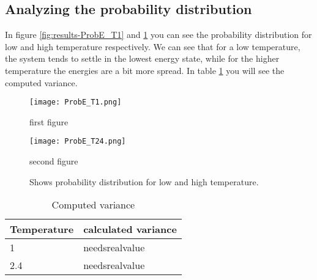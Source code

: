\documentclass[../main.tex]{subfiles}
\begin{document}
\subsection{Analyzing the probability distribution}
In figure \ref{fig:results-ProbE_T1} and \ref{fig:results-ProbE_T24} you can see the probability distribution for low and high temperature respectively. We can see that for a low temperature, the system tends to settle in the lowest energy state, while for the higher temperature the energies are a bit more spread. In table \ref{tab:results-variance} you will see the computed variance.
\begin{figure}[!h]
  \centering
  \begin{minipage}{0.5\textwidth}
        \centering
        \texttt{[image: ProbE\_T1.png]} %
        \caption{first figure}
    \end{minipage}\hfill
    \begin{minipage}{0.5\textwidth}
        \centering
        \texttt{[image: ProbE\_T24.png]} %
        \caption{second figure}
    \end{minipage}

  \caption{Shows probability distribution for low and high temperature.}
  \label{fig:results-ProbE_T24}
\end{figure}
\FloatBarrier
\begin{table}[!h]
  \begin{center}
    \begin{tabular}{l l}
      \hline
      Temperature & calculated variance\\
      \hline
      1 & needsrealvalue\\
      2.4 & needsrealvalue \\
      \hline
    \end{tabular}
    \caption{Computed variance}
    \label{tab:results-variance}
  \end{center}
\end{table}
\FloatBarrier
\end{document}
